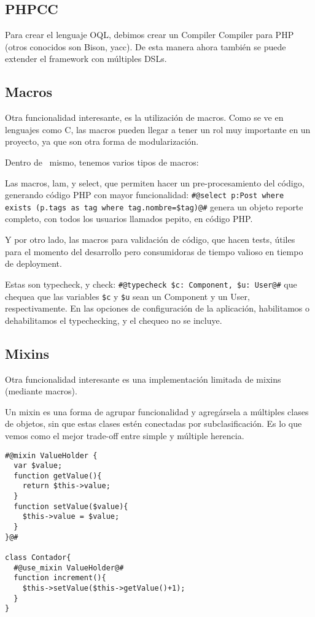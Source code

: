 \subsection{PHPCC}
\label{sub-phpcc}
Para crear el lenguaje OQL, debimos crear un Compiler Compiler para PHP (otros conocidos son Bison, yacc).
De esta manera ahora también se puede extender el framework con múltiples DSLs.

\subsection{Macros}
\label{sub-macros}
Otra funcionalidad interesante, es la utilización de macros. Como se ve en lenguajes como C, las macros pueden llegar a tener un rol muy importante en un proyecto, ya que son otra forma de modularización.

Dentro de \PWB \ mismo, tenemos varios tipos de macros:

Las macros, lam, y select, que permiten hacer un pre-procesamiento del código, generando código PHP con
mayor funcionalidad:
\verb"#@select p:Post where exists (p.tags as tag where tag.nombre=$tag)@#"%
genera un objeto reporte completo, con todos los usuarios llamados pepito, en código PHP.

Y por otro lado, las macros para validación de código, que hacen tests, útiles para el momento del desarrollo pero consumidoras de tiempo valioso en tiempo de deployment.

Estas son typecheck, y check:
\verb"#@typecheck $c: Component, $u: User@#"
que chequea que las variables \verb"$c" y \verb"$u" sean un Component y un User, respectivamente. En las opciones de configuración de la aplicación, habilitamos o dehabilitamos el typechecking, y el chequeo no se incluye.

\subsection{Mixins}
\label{sub-mixins}
Otra funcionalidad interesante es una implementación limitada de mixins (mediante macros).

Un mixin es una forma de agrupar funcionalidad y agregársela a múltiples clases de objetos, sin que estas clases estén conectadas por subclasificación. Es lo que vemos como el mejor trade-off entre simple y múltiple herencia.

\begin{verbatim}
#@mixin ValueHolder {
  var $value;
  function getValue(){
    return $this->value;
  }
  function setValue($value){
    $this->value = $value;
  }
}@#

class Contador{
  #@use_mixin ValueHolder@#
  function increment(){
    $this->setValue($this->getValue()+1);
  }
}
\end{verbatim}
